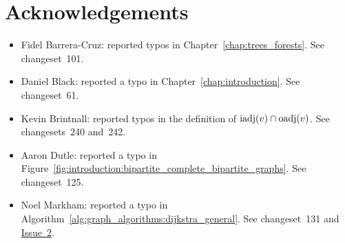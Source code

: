 
\chapter{Acknowledgements}

\begin{itemize}
\item Fidel Barrera-Cruz: reported typos in
  Chapter~\ref{chap:trees_forests}. See changeset~101.

\item Daniel Black: reported a typo in
  Chapter~\ref{chap:introduction}. See changeset~61.

\item Kevin Brintnall: reported typos in the definition of 
  $\operatorname*{iadj}(v) \cap \operatorname*{oadj}(v)$. See changesets~240 and~242.

\item Aaron Dutle: reported a typo in
  Figure~\ref{fig:introduction:bipartite_complete_bipartite_graphs}. See
  changeset~125.

\item Noel Markham: reported a typo in
  Algorithm~\ref{alg:graph_algorithms:dijkstra_general}. See
  changeset~131 and
  \href{http://code.google.com/p/graph-theory-algorithms-book/issues/detail?id=2}{Issue~2}.
\end{itemize}
